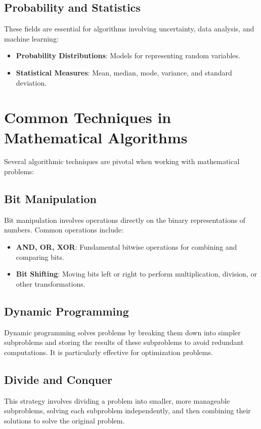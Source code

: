 \subsection{Probability and Statistics}
These fields are essential for algorithms involving uncertainty, data analysis, and machine learning:
\begin{itemize}
    \item \textbf{Probability Distributions}: Models for representing random variables.
    \item \textbf{Statistical Measures}: Mean, median, mode, variance, and standard deviation.
\end{itemize}

\section{Common Techniques in Mathematical Algorithms}
Several algorithmic techniques are pivotal when working with mathematical problems:

\subsection{Bit Manipulation}
Bit manipulation involves operations directly on the binary representations of numbers. Common operations include:
\begin{itemize}
    \item \textbf{AND, OR, XOR}: Fundamental bitwise operations for combining and comparing bits.
    \item \textbf{Bit Shifting}: Moving bits left or right to perform multiplication, division, or other transformations.
\end{itemize}

\subsection{Dynamic Programming}
Dynamic programming solves problems by breaking them down into simpler subproblems and storing the results of these subproblems to avoid redundant computations. It is particularly effective for optimization problems.

\subsection{Divide and Conquer}
This strategy involves dividing a problem into smaller, more manageable subproblems, solving each subproblem independently, and then combining their solutions to solve the original problem.

